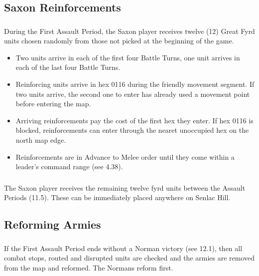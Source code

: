 \subsection{Saxon Reinforcements}

\subsubsection[First Assault Period]{} During the First Assault Period, the Saxon player receives twelve (12) Great Fyrd units chosen randomly from those not picked at the beginning of the game.

\begin{itemize}
  \item Two units arrive in each of the first four Battle Turns, one unit arrives in each of the last four Battle Turns.
  \item Reinforcing units arrive in hex 0116 during the friendly movement segment. If two units arrive, the second one to enter has already used a movement point before entering the map.
  \item Arriving reinforcements pay the cost of the first hex they enter. If hex 0116 is blocked, reinforcements can enter through the nearet unoccupied hex on the north map edge.
  \item Reinforcements are in Advance to Melee order until they come within a leader's command range (see 4.38).
\end{itemize}

\subsubsection[Remaining Units]{} The Saxon player receives the remaining twelve fyrd units between the Assault Periods (11.5). These can be immediately placed anywhere on Senlac Hill.

\subsection{Reforming Armies}

\subsubsection[First Assault Period]{} If the First Assault Period ends without a Norman victory (see 12.1), then all combat stops, routed and disrupted units are checked and the armies are removed from the map and reformed. The Normans reform first.

